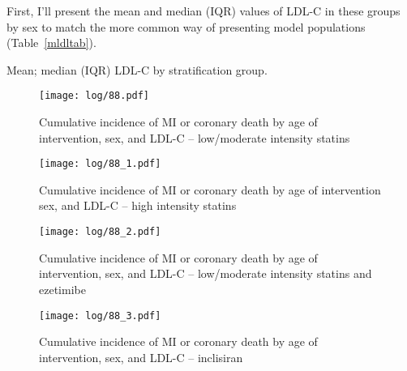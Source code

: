 \documentclass[11pt]{article}
\begin{document}
First, I'll present the mean and median (IQR) values of LDL-C in these groups by 
sex to match the more common way of presenting model populations 
(Table~\ref{mldltab}). 



\begin{table}[h!]
  \begin{center}
    \caption{Mean; median (IQR) LDL-C by stratification group.}
    \label{mldltab}
     \selectfont{}
  \end{center}
\end{table}


\color{Blue4}
\begin{stlog}\end{stlog}
\begin{figure}
    \centering
    \texttt{[image: log/88.pdf]}
    \caption{Cumulative incidence of MI or coronary death by age of intervention, sex, and LDL-C -- low/moderate intensity statins}
    \label{cumMIint00}
\end{figure}
\begin{figure}
    \centering
    \texttt{[image: log/88\_1.pdf]}
    \caption{Cumulative incidence of MI or coronary death by age of intervention sex, and LDL-C -- high intensity statins}
    \label{cumMIint00}
\end{figure}
\begin{figure}
    \centering
    \texttt{[image: log/88\_2.pdf]}
    \caption{Cumulative incidence of MI or coronary death by age of intervention, sex, and LDL-C -- low/moderate intensity statins and ezetimibe}
    \label{cumMIint00}
\end{figure}
\begin{figure}
    \centering
    \texttt{[image: log/88\_3.pdf]}
    \caption{Cumulative incidence of MI or coronary death by age of intervention, sex, and LDL-C -- inclisiran}
    \label{cumMIint00}
\end{figure}
\begin{stlog}\end{stlog}
\color{black}
\end{document}
